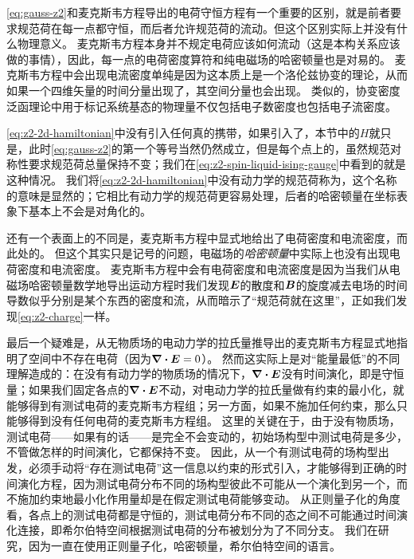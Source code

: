 \eqref{eq:gauss-z2}和麦克斯韦方程导出的电荷守恒方程有一个重要的区别，就是前者要求规范荷在每一点都守恒，而后者允许规范荷的流动。但这个区别实际上并没有什么物理意义。
麦克斯韦方程本身并不规定电荷应该如何流动（这是本构关系应该做的事情），因此，每一点的电荷密度算符和纯电磁场的哈密顿量也是对易的。
麦克斯韦方程中会出现电流密度单纯是因为这本质上是一个洛伦兹协变的理论，从而如果一个四维矢量的时间分量出现了，其空间分量也会出现。
类似的，协变密度泛函理论中用于标记系统基态的物理量不仅包括电子数密度也包括电子流密度。

\eqref{eq:z2-2d-hamiltonian}中没有引入任何真的携带，如果引入了，本节中的${H}$就只是，此时\eqref{eq:gauss-z2}的第一个等号当然仍然成立，但是每个点上的，虽然规范对称性要求规范荷总量保持不变；我们在\eqref{eq:z2-spin-liquid-ising-gauge}中看到的就是这种情况。
我们将\eqref{eq:z2-2d-hamiltonian}中没有动力学的规范荷称为，这个名称的意味是显然的；它相比有动力学的规范荷更容易处理，后者的哈密顿量在坐标表象下基本上不会是对角化的。

还有一个表面上的不同是，麦克斯韦方程中显式地给出了电荷密度和电流密度，而此处的。
但这个其实只是记号的问题，电磁场的\emph{哈密顿量}中实际上也没有出现电荷密度和电流密度。
麦克斯韦方程中会有电荷密度和电流密度是因为当我们从电磁场哈密顿量数学地导出运动方程时我们发现$\vb*{E}$的散度和$\vb*{B}$的旋度减去电场的时间导数似乎分别是某个东西的密度和流，从而暗示了“规范荷就在这里”，正如我们发现\eqref{eq:z2-charge}一样。

最后一个疑难是，从无物质场的电动力学的拉氏量推导出的麦克斯韦方程显式地指明了空间中不存在电荷（因为$\div{\vb*{E}} = 0$）。
然而这实际上是对“能量最低”的不同理解造成的：在没有有动力学的物质场的情况下，$\div{\vb*{E}}$没有时间演化，即是守恒量；如果我们固定各点的$\div{\vb*{E}}$不动，对电动力学的拉氏量做有约束的最小化，就能够得到有测试电荷的麦克斯韦方程组；另一方面，如果不施加任何约束，那么只能够得到没有任何电荷的麦克斯韦方程组。
这里的关键在于，由于没有物质场，测试电荷——如果有的话——是完全不会变动的，初始场构型中测试电荷是多少，不管做怎样的时间演化，它都保持不变。
因此，从一个有测试电荷的场构型出发，必须手动将“存在测试电荷”这一信息以约束的形式引入，才能够得到正确的时间演化方程，因为测试电荷分布不同的场构型彼此不可能从一个演化到另一个，而不施加约束地最小化作用量却是在假定测试电荷能够变动。
从正则量子化的角度看，各点上的测试电荷都是守恒的，测试电荷分布不同的态之间不可能通过时间演化连接，即希尔伯特空间根据测试电荷的分布被划分为了不同分支。
我们在研究，因为一直在使用正则量子化，哈密顿量，希尔伯特空间的语言。

